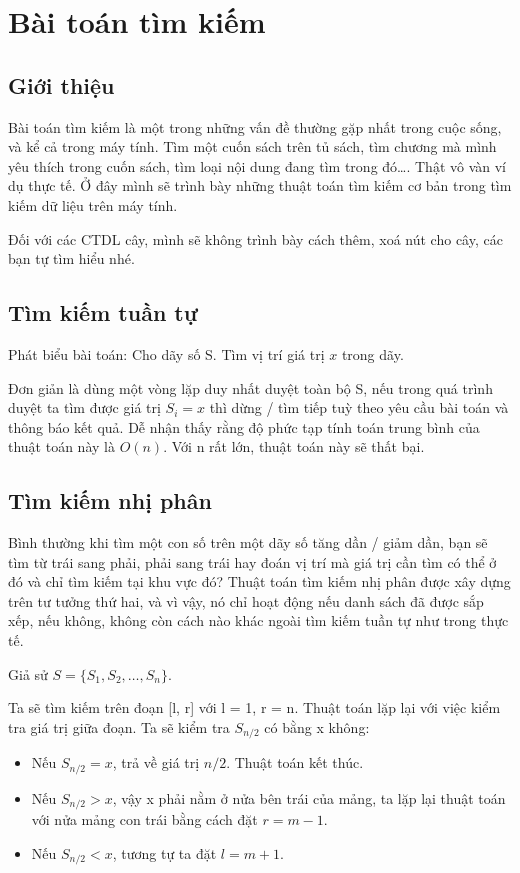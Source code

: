 \chapter{Bài toán tìm kiếm}
\section{Giới thiệu}
Bài toán tìm kiếm là một trong những vấn đề thường gặp nhất trong cuộc sống, và kể cả trong máy tính. Tìm một cuốn sách trên tủ sách, tìm chương mà mình yêu thích trong cuốn sách, tìm loại nội dung đang tìm trong đó\dots. Thật vô vàn ví dụ thực tế. Ở đây mình sẽ trình bày những thuật toán tìm kiếm cơ bản trong tìm kiếm dữ liệu trên máy tính.

Đối với các CTDL cây, mình sẽ không trình bày cách thêm, xoá nút cho cây, các bạn tự tìm hiểu nhé.

\section{Tìm kiếm tuần tự}
Phát biểu bài toán: Cho dãy số S. Tìm vị trí giá trị $x$ trong dãy.

Đơn giản là dùng một vòng lặp duy nhất duyệt toàn bộ S, nếu trong quá trình duyệt ta tìm được giá trị $S_i=x$ thì dừng / tìm tiếp tuỳ theo yêu cầu bài toán và thông báo kết quả. Dễ nhận thấy rằng độ phức tạp tính toán trung bình của thuật toán này là $O(n)$. Với n rất lớn, thuật toán này sẽ thất bại.

\section{Tìm kiếm nhị phân}
Bình thường khi tìm một con số trên một dãy số tăng dần / giảm dần, bạn sẽ tìm từ trái sang phải, phải sang trái hay đoán vị trí mà giá trị cần tìm có thể ở đó và chỉ tìm kiếm tại khu vực đó? Thuật toán tìm kiếm nhị phân được xây dựng trên tư tưởng thứ hai, và vì vậy, nó chỉ hoạt động nếu danh sách đã được sắp xếp, nếu không, không còn cách nào khác ngoài tìm kiếm tuần tự như trong thực tế.

Giả sử $S=\{S_1,S_2,\dots,S_n\}$.

Ta sẽ tìm kiếm trên đoạn [l, r] với l = 1, r = n. Thuật toán lặp lại với việc kiểm tra giá trị giữa đoạn. Ta sẽ kiểm tra $S_{n/2}$ có bằng x không:
\begin{itemize}
    \item Nếu $S_{n/2}=x$, trả về giá trị $n/2$. Thuật toán kết thúc.
    \item Nếu $S_{n/2}>x$, vậy x phải nằm ở nửa bên trái của mảng, ta lặp lại thuật toán với nửa mảng con trái bằng cách đặt $r=m-1$.
    \item Nếu $S_{n/2}<x$, tương tự ta đặt $l=m+1$.
\end{itemize}

